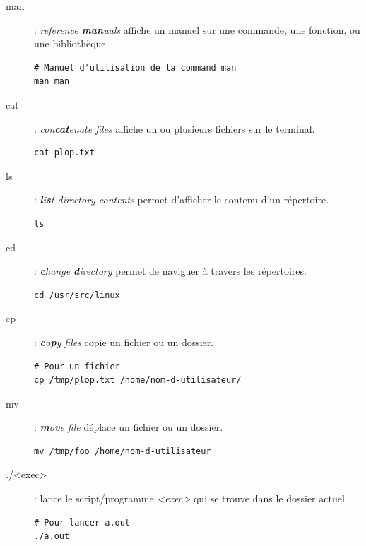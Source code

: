 \documentclass[french, a4paper, 12pt, titlepage]{article}
\begin{document}
\begin{description}
\item[man]: \emph{reference \textbf{man}uals} affiche un manuel sur une
	commande, une fonction, ou une bibliothèque.

  \begin{lstlisting}
# Manuel d'utilisation de la command man
man man
  \end{lstlisting}

\item[cat]: \emph{con\textbf{cat}enate files} affiche un ou plusieurs fichiers
	sur le terminal.

  \begin{lstlisting}
cat plop.txt
  \end{lstlisting}

\item[ls]: \emph{\textbf{l}i\textbf{s}t directory contents} permet d'afficher
	le contenu d'un répertoire.

  \begin{lstlisting}
ls
  \end{lstlisting}

\item[cd]: \emph{\textbf{c}hange \textbf{d}irectory} permet de naviguer à
	travers les répertoires.

  \begin{lstlisting}
cd /usr/src/linux
  \end{lstlisting}

\item[cp]: \emph{\textbf{c}o\textbf{p}y files} copie un fichier ou un dossier.

  \begin{lstlisting}
# Pour un fichier
cp /tmp/plop.txt /home/nom-d-utilisateur/
  \end{lstlisting}

\item[mv]: \emph{\textbf{m}o\textbf{v}e file} déplace un fichier ou un dossier.

  \begin{lstlisting}
mv /tmp/foo /home/nom-d-utilisateur
  \end{lstlisting}

\item[./<exec>]: lance le script/programme \emph{<exec>} qui se trouve dans le
	dossier actuel.

  \begin{lstlisting}
# Pour lancer a.out
./a.out
  \end{lstlisting}

\end{description}
\end{document}
